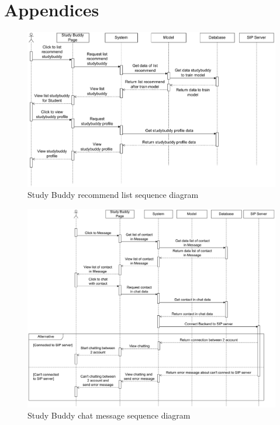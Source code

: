 \documentclass[12pt]{article}
\begin{document}
\pagebreak
\renewcommand{\bibname}{REFERENCES} 
\begingroup
 
 
\endgroup

\pagebreak

\appendix
\section*{Appendices}

\begin{figure}[H]
        \centering
        \includegraphics[width=1\textwidth]{image/StudyBuddySequenceDiagram-SB.pdf} 
        \caption{Study Buddy recommend list sequence diagram}
        \label{fig:studyBuddy_recommendlist_sequence}
    \end{figure}

    \begin{figure}[H]
        \centering
        \includegraphics[width=1\textwidth, height=0.5\textheight]{image/StudyBuddySequenceDiagram-Message.pdf} 
        \caption{Study Buddy chat message sequence diagram}
        \label{fig:studyBuddy_chatmessage_sequence}
    \end{figure}
\end{document}
